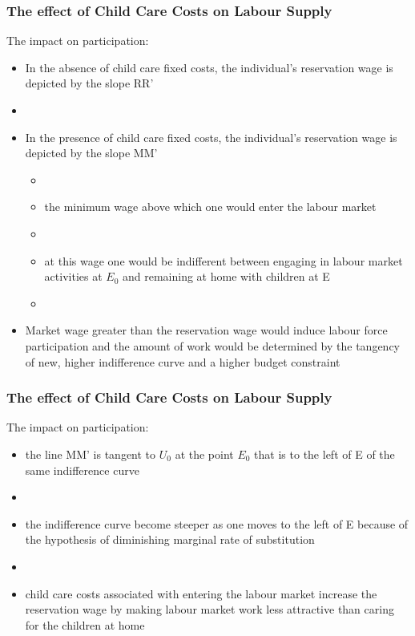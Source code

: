 \documentclass[aspectratio=169]{beamer}
\begin{document}
 
   \begin{frame}
  \frametitle{The effect of Child Care Costs on Labour Supply}
The impact on participation:

\begin{itemize}
\item In the absence of child care fixed costs, the individual's reservation wage is depicted by the slope RR'
\item[]
\item In the presence of child care fixed costs, the individual's reservation wage is depicted by the slope MM'
\begin{itemize}
\item[]
\item the minimum wage above which one would enter the labour market
\item[]
\item at this wage one would be indifferent between engaging in labour market activities at $E_{0}$ and remaining at home with children at E
\item[]
\end{itemize}

\item Market wage greater than the reservation wage would induce labour force participation and the amount of work would be determined by the tangency of new, higher indifference curve and a higher budget constraint

\end{itemize}

\end{frame} 
 
 
    \begin{frame}
  \frametitle{The effect of Child Care Costs on Labour Supply}
The impact on participation:

\begin{itemize}

\item the line MM' is tangent to $U_{0}$ at the point  $E_{0}$ that is to the left of E of the same indifference curve
\item[]
\item the indifference curve become steeper as one moves to the left of E because of the hypothesis of diminishing marginal rate of substitution
\item[]
\item child care costs associated with entering the labour market increase the reservation wage by making labour market work less attractive than caring for the children at home

\end{itemize}

\end{frame} 
 
\end{document}
